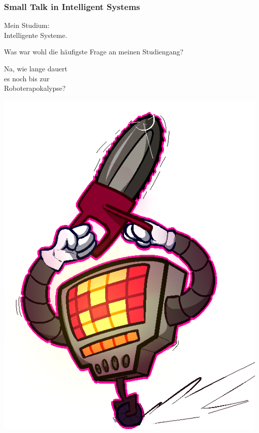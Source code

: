 \documentclass[aspectratio=43,x11names]{beamer}
\begin{document}

\begin{frame}
\frametitle{Small Talk in Intelligent Systems}

\begin{multicols}{2}

Mein Studium:\\ \glqq Intelligente Systeme\grqq .
\medskip

Was war wohl die häufigste Frage an meinen Studiengang?

\pause

\begin{center}
\glqq Na, wie lange dauert\\ es noch bis zur\\ Roboterapokalypse?\grqq
\end{center}

\columnbreak

\begin{center}
\includegraphics[height=0.7\textheight,keepaspectratio]{images/mtt.png} 
\end{center}
\end{multicols}
\end{frame}
\end{document}
